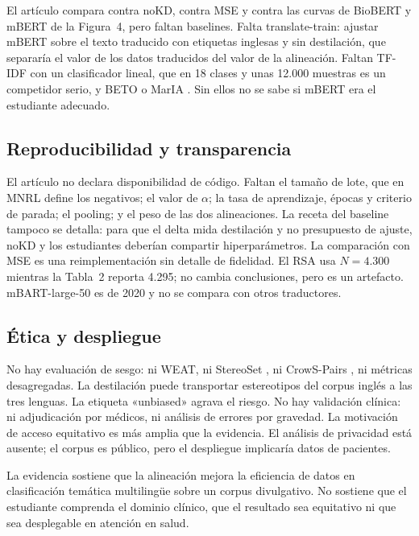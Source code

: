 El artículo compara contra noKD, contra MSE y contra las curvas de BioBERT y mBERT de la Figura~4, pero faltan baselines. Falta translate-train: ajustar mBERT sobre el texto traducido con etiquetas inglesas y sin destilación, que separaría el valor de los datos traducidos del valor de la alineación. Faltan TF-IDF con un clasificador lineal, que en 18 clases y unas 12.000 muestras es un competidor serio, y BETO \cite{canete2020} o MarIA \cite{gutierrez2022}. Sin ellos no se sabe si mBERT era el estudiante adecuado.

\subsection{Reproducibilidad y transparencia}

El artículo no declara disponibilidad de código. Faltan el tamaño de lote, que en MNRL define los negativos; el valor de $\alpha$; la tasa de aprendizaje, épocas y criterio de parada; el pooling; y el peso de las dos alineaciones. La receta del baseline tampoco se detalla: para que el delta mida destilación y no presupuesto de ajuste, noKD y los estudiantes deberían compartir hiperparámetros. La comparación con MSE es una reimplementación sin detalle de fidelidad. El RSA usa $N = 4.300$ mientras la Tabla~2 reporta 4.295; no cambia conclusiones, pero es un artefacto. mBART-large-50 es de 2020 y no se compara con otros traductores.

\subsection{Ética y despliegue}

No hay evaluación de sesgo: ni WEAT, ni StereoSet \cite{nadeem2021}, ni CrowS-Pairs \cite{nangia2020}, ni métricas desagregadas. La destilación puede transportar estereotipos del corpus inglés a las tres lenguas. La etiqueta «unbiased» agrava el riesgo. No hay validación clínica: ni adjudicación por médicos, ni análisis de errores por gravedad. La motivación de acceso equitativo es más amplia que la evidencia. El análisis de privacidad está ausente; el corpus es público, pero el despliegue implicaría datos de pacientes.

La evidencia sostiene que la alineación mejora la eficiencia de datos en clasificación temática multilingüe sobre un corpus divulgativo. No sostiene que el estudiante comprenda el dominio clínico, que el resultado sea equitativo ni que sea desplegable en atención en salud.

